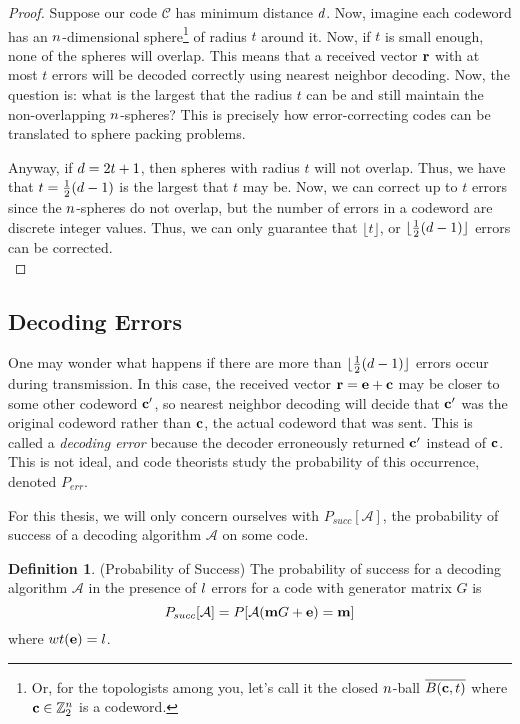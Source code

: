 \documentclass[12pt,twoside]{reedthesis}
\theoremstyle{definition}
\newtheorem{definition}[theorem]{Definition}
\newcommand{\Z}{\mathbb{Z}}
\begin{document}
\begin{proof}
Suppose our code $\mathscr{C}$ has minimum distance $d$. Now, imagine each codeword has an $n$-dimensional sphere\footnote{Or, for the topologists among you, let's call it the closed $n$-ball $\overline{B(\mathbf{c}, t)}$ where $\cw \in \Z_2^\clen$ is a codeword.} of radius $t$ around it. Now, if $t$ is small enough, none of the spheres will overlap. This means that a received vector $\mathbf{r}$ with at most $t$ errors will be decoded correctly using nearest neighbor decoding. Now, the question is: what is the largest that the radius $t$ can be and still maintain the non-overlapping $n$-spheres? This is precisely how error-correcting codes can be translated to sphere packing problems.

Anyway, if $d = 2t+1$, then spheres with radius $t$ will not overlap. Thus, we have that $t = \frac{1}{2}(d-1)$ is the largest that $t$ may be. Now, we can correct up to $t$ errors since the $n$-spheres do not overlap, but the number of errors in a codeword are discrete integer values. Thus, we can only guarantee that $\lfloor t \rfloor$, or $\lfloor \frac{1}{2} (d-1)\rfloor$ errors can be corrected.\\
\end{proof}

\subsection{Decoding Errors}
One may wonder what happens if there are more than $\lfloor \frac{1}{2}(d-1)\rfloor$ errors occur during transmission. In this case, the received vector $\mathbf{r} = \mathbf{e}+\mathbf{c}$ may be closer to some other codeword $\mathbf{c}'$, so nearest neighbor decoding will decide that $\mathbf{c}'$ was the original codeword rather than $\mathbf{c}$, the actual codeword that was sent. This is called a \textit{decoding error} because the decoder erroneously returned $\mathbf{c}'$ instead of $\mathbf{c}$. This is not ideal, and code theorists study the probability of this occurrence, denoted $P_{err}$. 

For this thesis, we will only concern ourselves with $P_{succ}[\mathcal{A}]$, the probability of success of a decoding algorithm $\mathcal{A}$ on some code. 
\begin{definition}(Probability of Success) The probability of success for a decoding algorithm $\mathcal{A}$ in the presence of $l$ errors for a code with generator matrix $G$ is 
\begin{equation*}
P_{succ}[\mathcal{A}] = P[\mathcal{A}(\mathbf{m} G + \mathbf{e}) = \mathbf{m}]
\end{equation*}
where $wt(\mathbf{e}) = l$.
\end{definition}
\end{document}
